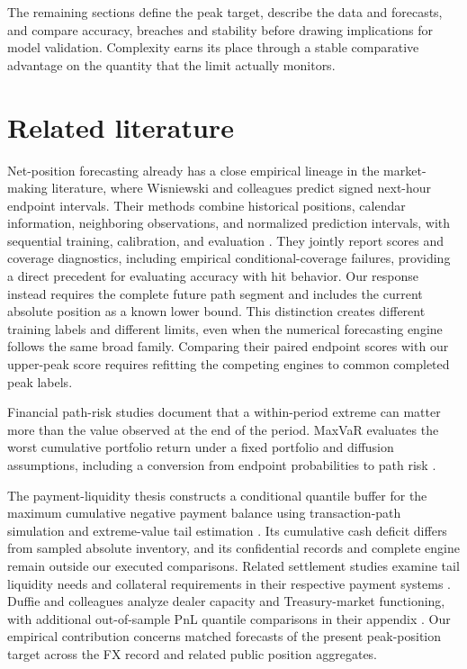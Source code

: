 \documentclass[11pt,a4paper]{article}
\begin{document}
The remaining sections define the peak target, describe the data and forecasts, and compare accuracy, breaches and stability before drawing implications for model validation. Complexity earns its place through a stable comparative advantage on the quantity that the limit actually monitors.


\FloatBarrier

\section{Related literature}\label{sec:literature}

Net-position forecasting already has a close empirical lineage in the market-making literature, where Wisniewski and colleagues predict signed next-hour endpoint intervals. Their methods combine historical positions, calendar information, neighboring observations, and normalized prediction intervals, with sequential training, calibration, and evaluation \citep{wisniewski2020,wisniewski2024}. They jointly report scores and coverage diagnostics, including empirical conditional-coverage failures, providing a direct precedent for evaluating accuracy with hit behavior. Our response instead requires the complete future path segment and includes the current absolute position as a known lower bound. This distinction creates different training labels and different limits, even when the numerical forecasting engine follows the same broad family. Comparing their paired endpoint scores with our upper-peak score requires refitting the competing engines to common completed peak labels.


Financial path-risk studies document that a within-period extreme can matter more than the value observed at the end of the period. MaxVaR evaluates the worst cumulative portfolio return under a fixed portfolio and diffusion assumptions, including a conversion from endpoint probabilities to path risk \citep{boudoukh2004}.

The payment-liquidity thesis constructs a conditional quantile buffer for the maximum cumulative negative payment balance using transaction-path simulation and extreme-value tail estimation \citep{hoogen2017}. Its cumulative cash deficit differs from sampled absolute inventory, and its confidential records and complete engine remain outside our executed comparisons. Related settlement studies examine tail liquidity needs and collateral requirements in their respective payment systems \citep{petrunia2019,arjani2020}. Duffie and colleagues analyze dealer capacity and Treasury-market functioning, with additional out-of-sample PnL quantile comparisons in their appendix \citep{duffie2023}. Our empirical contribution concerns matched forecasts of the present peak-position target across the FX record and related public position aggregates.
\end{document}
